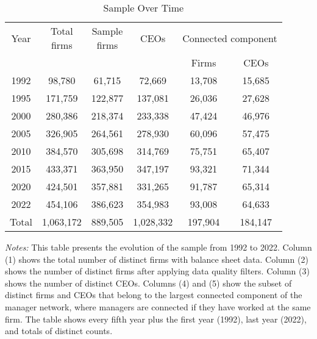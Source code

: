 \begin{table}[htbp]
\centering
\caption{Sample Over Time}
\label{tab:sample}
\begin{tabular}{*{6}{c}}
\toprule
Year & \shortstack{Total\\firms} & \shortstack{Sample\\firms} & CEOs & \multicolumn{2}{c}{Connected component} \\
\cmidrule(lr){5-6}
 & & & & Firms & CEOs \\
\midrule
1992 &       98,780 &       61,715 &       72,669 &       13,708 &       15,685 \\
1995 &      171,759 &      122,877 &      137,081 &       26,036 &       27,628 \\
2000 &      280,386 &      218,374 &      233,338 &       47,424 &       46,976 \\
2005 &      326,905 &      264,561 &      278,930 &       60,096 &       57,475 \\
2010 &      384,570 &      305,698 &      314,769 &       75,751 &       65,407 \\
2015 &      433,371 &      363,950 &      347,197 &       93,321 &       71,344 \\
2020 &      424,501 &      357,881 &      331,265 &       91,787 &       65,314 \\
2022 &      454,106 &      386,623 &      354,983 &       93,008 &       64,633 \\
\midrule
Total &    1,063,172 &      889,505 &    1,028,332 &      197,904 &      184,147 \\
\bottomrule
\end{tabular}
\begin{minipage}{12cm}
\footnotesize
\textit{Notes:} This table presents the evolution of the sample from 1992 to 2022. Column (1) shows the total number of distinct firms with balance sheet data. Column (2) shows the number of distinct firms after applying data quality filters. Column (3) shows the number of distinct CEOs. Columns (4) and (5) show the subset of distinct firms and CEOs that belong to the largest connected component of the manager network, where managers are connected if they have worked at the same firm. The table shows every fifth year plus the first year (1992), last year (2022), and totals of distinct counts. \end{minipage}
\end{table}
